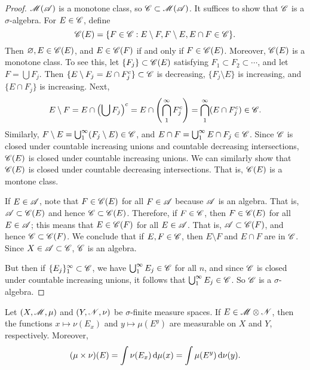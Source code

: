 \documentclass[12pt]{article} %
\begin{document}
\begin{proof}
    $\mathscr{M}(\mathscr{A})$ is a monotone class, so $\mathscr{C} \subset \mathscr{M}(\mathscr{A})$. It suffices to show that $\mathscr{C}$ is a $\sigma$-algebra. For $E \in \mathscr{C}$, define \[\mathscr{C}(E) = \{F \in \mathscr{C} : E \setminus F, F \setminus E, E \cap F \in \mathscr{C}\}.\] Then $\varnothing, E \in \mathscr{C}(E)$, and $E \in \mathscr{C}(F)$ if and only if $F \in \mathscr{C}(E)$. Moreover, $\mathscr{C}(E)$ is a monotone class. To see this, let $\{F_j\} \subset \mathscr{C}(E)$ satisfying $F_1 \subset F_2 \subset \cdots$, and let $F = \bigcup F_j$. Then $\{E \setminus F_j = E \cap F_j^c\} \subset \mathscr{C}$ is decreasing, $\{F_j \setminus E\}$ is increasing, and $\{E \cap F_j \}$ is increasing. Next, \[E \setminus F = E \cap \left(\bigcup F_j \right)^c = E \cap \left( \bigcap_1^\infty F_j^c \right) = \bigcap_1^\infty (E \cap F_j^c) \in \mathscr{C}.\] Similarly, $F \setminus E = \bigcup_1^\infty (F_j \setminus E) \in \mathscr{C}$, and $E \cap F = \bigcup_1^\infty E \cap F_j \in \mathscr{C}$. Since $\mathscr{C}$ is closed under countable increasing unions and countable decreasing intersections, $\mathscr{C}(E)$ is closed under countable increasing unions. We can similarly show that $\mathscr{C}(E)$ is closed under countable decreasing intersections. That is, $\mathscr{C}(E)$ is a montone class.

    If $E \in \mathscr{A}$, note that $F \in \mathscr{C}(E)$ for all $F \in \mathscr{A}$ because $\mathscr{A}$ is an algebra. That is, $\mathscr{A} \subset \mathscr{C}(E)$ and hence $\mathscr{C} \subset \mathscr{C}(E)$. Therefore, if $F \in \mathscr{C}$, then $F \in \mathscr{C}(E)$ for all $E \in \mathscr{A}$; this means that $E \in \mathscr{C}(F)$ for all $E \in \mathscr{A}$. That is, $\mathscr{A} \subset \mathscr{C}(F)$, and hence $\mathscr{C} \subset \mathscr{C}(F)$. We conclude that if $E, F \in \mathscr{C}$, then $E \setminus F$ and $E \cap F$ are in $\mathscr{C}$. Since $X \in \mathscr{A} \subset \mathscr{C}$, $\mathscr{C}$ is an algebra.

    But then if $\{E_j\}_1^\infty \subset \mathscr{C}$, we have $\bigcup_1^\infty E_j \in \mathscr{C}$ for all $n$, and since $\mathscr{C}$ is closed under countable increasing unions, it follows that $\bigcup_1^\infty E_j \in \mathscr{C}$. So $\mathscr{C}$ is a $\sigma$-algebra.
\end{proof}

\begin{theorem}\label{thm:baby-fubini-tonelli}
    Let $(X, \mathscr{M}, \mu)$ and $(Y, \mathscr{N}, \nu)$ be $\sigma$-finite measure spaces. If $E \in \mathscr{M} \otimes \mathscr{N}$, then the functions $x \mapsto \nu(E_x)$ and $y \mapsto \mu(E^y)$ are measurable on $X$ and $Y$, respectively. Moreover, \[(\mu \times \nu) (E) = \int \nu(E_x) \, \mathrm{d} \mu(x) = \int \mu(E^y) \, \mathrm{d} \nu(y).\]
\end{theorem}
\end{document}
